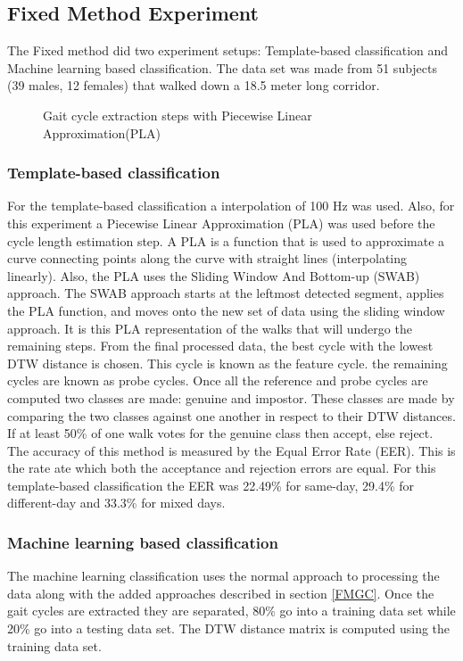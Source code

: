 \documentclass{sig-alternate}
\begin{document}
\subsection{Fixed Method Experiment}
	The Fixed method did two experiment setups: Template-based classification and Machine learning based classification. The data set was made from 51 subjects (39 males, 12 females) that walked down a 18.5 meter long corridor.

\begin{figure}
\centering
{}
\caption{Gait cycle extraction steps with Piecewise Linear Approximation(PLA)}
\label{fig:AddedStep}
\end{figure}
\subsubsection{Template-based classification}
	 For the template-based classification a interpolation of 100 Hz was used. Also, for this experiment a Piecewise Linear Approximation (PLA) was used before the cycle length estimation step. A PLA is a function that is used to approximate a curve connecting points along the curve with straight lines (interpolating linearly). Also, the PLA uses the Sliding Window And Bottom-up (SWAB) approach. The SWAB approach starts at the leftmost detected segment, applies the PLA function, and moves onto the new set of data using the sliding window approach. It is this PLA representation of the walks that will undergo the remaining steps. From the final processed data, the best cycle with the lowest DTW distance is chosen. This cycle is known as the feature cycle. the remaining cycles are known as probe cycles. Once all the reference and probe cycles are computed two classes are made: genuine and impostor. These classes are made by comparing the two classes against one another in respect to their DTW distances. If at least 50\% of one walk votes for the genuine class then accept, else reject. The accuracy of this method is measured by the Equal Error Rate (EER). This is the rate ate which both the acceptance and rejection errors are equal. For this template-based classification the EER was 22.49\% for same-day, 29.4\% for different-day and 33.3\% for mixed days. 
\subsubsection{Machine learning based classification}
The machine learning classification uses the normal approach to processing the data along with the added approaches described in section \ref{FMGC}. Once the gait cycles are extracted they are separated, 80\% go into a training data set while 20\% go into a testing data set. The DTW distance matrix is computed using the training data set. 
\end{document}

